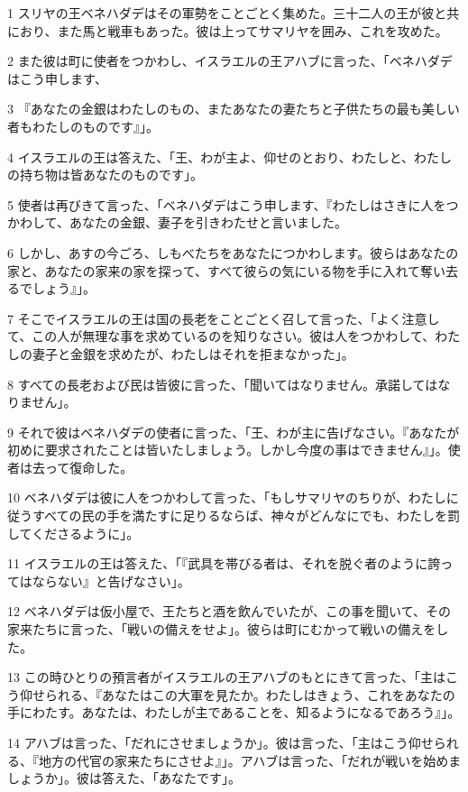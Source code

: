 \par 1 スリヤの王ベネハダデはその軍勢をことごとく集めた。三十二人の王が彼と共におり、また馬と戦車もあった。彼は上ってサマリヤを囲み、これを攻めた。
\par 2 また彼は町に使者をつかわし、イスラエルの王アハブに言った、「ベネハダデはこう申します、
\par 3 『あなたの金銀はわたしのもの、またあなたの妻たちと子供たちの最も美しい者もわたしのものです』」。
\par 4 イスラエルの王は答えた、「王、わが主よ、仰せのとおり、わたしと、わたしの持ち物は皆あなたのものです」。
\par 5 使者は再びきて言った、「ベネハダデはこう申します、『わたしはさきに人をつかわして、あなたの金銀、妻子を引きわたせと言いました。
\par 6 しかし、あすの今ごろ、しもべたちをあなたにつかわします。彼らはあなたの家と、あなたの家来の家を探って、すべて彼らの気にいる物を手に入れて奪い去るでしょう』」。
\par 7 そこでイスラエルの王は国の長老をことごとく召して言った、「よく注意して、この人が無理な事を求めているのを知りなさい。彼は人をつかわして、わたしの妻子と金銀を求めたが、わたしはそれを拒まなかった」。
\par 8 すべての長老および民は皆彼に言った、「聞いてはなりません。承諾してはなりません」。
\par 9 それで彼はベネハダデの使者に言った、「王、わが主に告げなさい。『あなたが初めに要求されたことは皆いたしましょう。しかし今度の事はできません』」。使者は去って復命した。
\par 10 ベネハダデは彼に人をつかわして言った、「もしサマリヤのちりが、わたしに従うすべての民の手を満たすに足りるならば、神々がどんなにでも、わたしを罰してくださるように」。
\par 11 イスラエルの王は答えた、「『武具を帯びる者は、それを脱ぐ者のように誇ってはならない』と告げなさい」。
\par 12 ベネハダデは仮小屋で、王たちと酒を飲んでいたが、この事を聞いて、その家来たちに言った、「戦いの備えをせよ」。彼らは町にむかって戦いの備えをした。
\par 13 この時ひとりの預言者がイスラエルの王アハブのもとにきて言った、「主はこう仰せられる、『あなたはこの大軍を見たか。わたしはきょう、これをあなたの手にわたす。あなたは、わたしが主であることを、知るようになるであろう』」。
\par 14 アハブは言った、「だれにさせましょうか」。彼は言った、「主はこう仰せられる、『地方の代官の家来たちにさせよ』」。アハブは言った、「だれが戦いを始めましょうか」。彼は答えた、「あなたです」。
